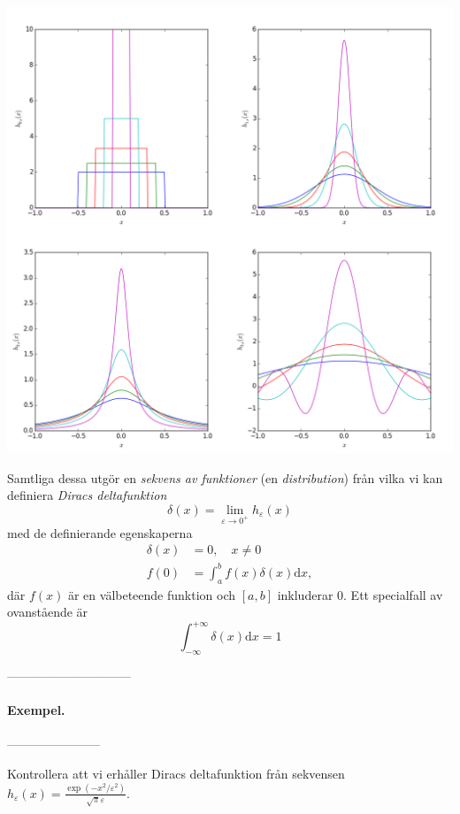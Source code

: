 \documentclass[%
oneside,                 %
final,                   %
10pt]{article}
\begin{document}
\centerline{\includegraphics[width=0.95\linewidth]{fig/deltas.png}}



Samtliga dessa utgör en \emph{sekvens av funktioner} (en \emph{distribution}) från vilka vi kan definiera \emph{Diracs deltafunktion}
\begin{equation}
\delta(x) = \lim_{\varepsilon \to 0^+} h_\varepsilon(x)
\end{equation}
med de definierande egenskaperna
\begin{align}
\delta(x) &= 0, \quad x \neq 0 \\ 
f(0) &= \int_a^b f(x) \delta(x) \mbox{d}x,
\end{align}
där $f(x)$ är en välbeteende funktion och $\left[ a,b \right]$ inkluderar 0. Ett specialfall av ovanstående är
\begin{equation}
\int_{-\infty}^{+\infty} \delta(x) \mbox{d}x = 1
\end{equation}

------------------------------

\paragraph{Exempel.}
-----------------------

Kontrollera att vi erhåller Diracs deltafunktion från sekvensen $h_\varepsilon(x) = \frac{\exp(-x^2 / \varepsilon^2)}{\sqrt{\pi} \varepsilon}$.
\end{document}
